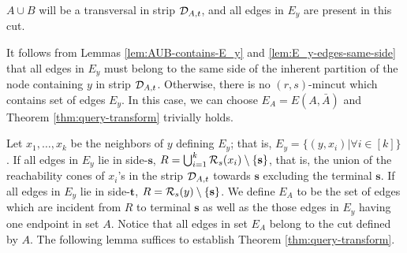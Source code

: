 \begin{lemma}
$A\cup B$ will be a transversal in strip ${\cal D}_{A,t}$, and all edges in $E_y$ are present in this cut.

\label{lem:AUB-contains-E_y}
\end{lemma}

It follows from Lemmas \ref{lem:AUB-contains-E_y} and \ref{lem:E_y-edges-same-side} that all edges in $E_y$ must belong to the same side of the inherent partition of the node containing $y$ in strip ${\cal D}_{A,t}$. 
Otherwise, there is no $(r,s)$-mincut which contains set of edges $E_y$. In this case, we can choose $E_A = E(A,{\bar A})$ and Theorem \ref{thm:query-transform} trivially holds.

Let $x_1,\ldots,x_k$ be the neighbors of $y$ defining $E_y$; that is, $E_y = \{(y,x_i)|
\forall i\in [k]\}$. 
If all edges in $E_y$ lie in side-$\mathbf{s}$,
$R=\bigcup_{i=1}^{k}{\cal R}_s(x_i) \setminus \{\mathbf{s}\}$, that is, the union of the reachability cones of $x_i$'s in the strip ${\cal D}_{A,t}$ towards $\mathbf{s}$ excluding the terminal ${\mathbf{s}}$. If all edges in $E_y$ lie in side-$\mathbf{t}$,
$R={\cal R}_s(y) \setminus \{\mathbf{s}\}$.
We define $E_A$ to be the set of edges which are incident from $R$ to terminal $\mathbf{s}$ as well as the those edges in $E_y$ having one endpoint in set $A$. Notice that all edges in set $E_A$
belong to the cut defined by $A$. The following lemma suffices to establish Theorem  \ref{thm:query-transform}.

